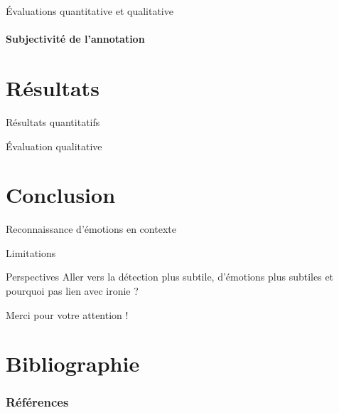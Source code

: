 \documentclass[11pt,aspectratio=169]{beamer}
\begin{document}
\begin{frame}{Évaluations quantitative et qualitative}
    \framesubtitle{Subjectivité de l'annotation}
    
\end{frame}

\section{Résultats}

\begin{frame}{Résultats quantitatifs}
    
\end{frame}

\begin{frame}{Évaluation qualitative}
    
\end{frame}

\section{Conclusion}

\begin{frame}{Reconnaissance d'émotions en contexte}
    
\end{frame}

\begin{frame}{Limitations}
    
\end{frame}

\begin{frame}{Perspectives}
    Aller vers la détection plus subtile, d'émotions plus subtiles et pourquoi pas lien avec ironie ?
\end{frame}

\begin{frame}[plain]
    Merci pour votre attention !
\end{frame}


\section{Bibliographie}

\begin{frame}[t,allowframebreaks]
\frametitle{Références}
\printbibliography
\end{frame}
\end{document}
